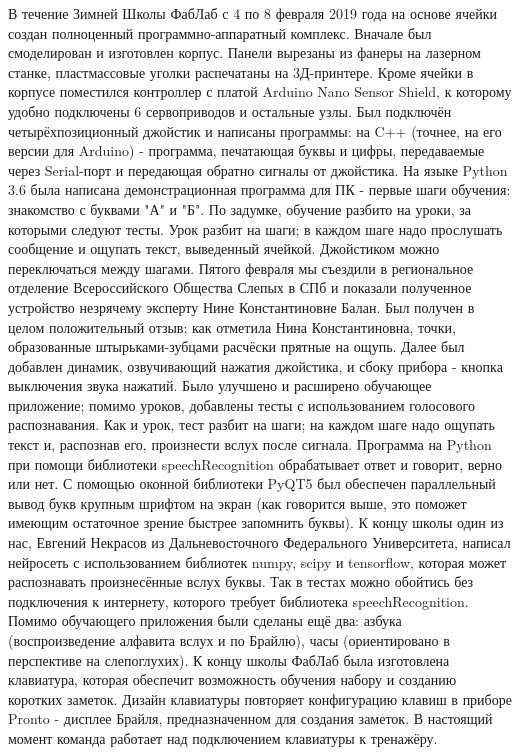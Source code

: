 \documentclass[a4paper,12pt]{article} %
\begin{document}
В течение Зимней Школы ФабЛаб с 4 по 8 февраля 2019 года на основе ячейки создан полноценный программно-аппаратный комплекс.
Вначале был смоделирован и изготовлен корпус. Панели вырезаны из фанеры на лазерном станке, пластмассовые уголки распечатаны на 3Д-принтере. Кроме ячейки в корпусе поместился контроллер с платой Arduino Nano Sensor Shield, к которому удобно подключены 6 сервоприводов и остальные узлы.
Был подключён четырёхпозиционный джойстик и написаны программы: на C++ (точнее, на его версии для Arduino) - программа, печатающая буквы и цифры, передаваемые через Serial-порт и передающая обратно сигналы от джойстика. На языке Python 3.6 была написана демонстрационная программа для ПК - первые шаги обучения: знакомство с буквами "А" и "Б". По задумке, обучение разбито на уроки, за которыми следуют тесты. Урок разбит на шаги; в каждом шаге надо прослушать сообщение и ощупать текст, выведенный ячейкой. Джойстиком можно переключаться между шагами.
Пятого февраля мы съездили в региональное отделение Всероссийского Общества Слепых в СПб и показали полученное устройство незрячему эксперту Нине Константиновне Балан. Был получен в целом положительный отзыв; как отметила Нина Константиновна, точки, образованные штырьками-зубцами расчёски прятные на ощупь.
Далее был добавлен динамик, озвучивающий нажатия джойстика, и сбоку прибора - кнопка выключения звука нажатий. Было улучшено и расширено обучающее приложение; помимо уроков, добавлены тесты с использованием голосового распознавания. Как и урок, тест разбит на шаги; на каждом шаге надо ощупать текст и, распознав его, произнести вслух после сигнала. Программа на Python при помощи библиотеки speechRecognition обрабатывает ответ и говорит, верно или нет.
С помощью оконной библиотеки PyQT5 был обеспечен параллельный вывод букв крупным шрифтом на экран (как говорится выше, это поможет имеющим остаточное зрение быстрее запомнить буквы).
К концу школы один из нас, Евгений Некрасов из Дальневосточного Федерального Университета, написал нейросеть с использованием библиотек numpy, scipy и tensorflow, которая может распознавать произнесённые вслух буквы. Так в тестах можно обойтись без подключения к интернету, которого требует библиотека speechRecognition.
Помимо обучающего приложения были сделаны ещё два: азбука (воспроизведение алфавита вслух и по Брайлю), часы (ориентировано в перспективе на слепоглухих).
К концу школы ФабЛаб была изготовлена клавиатура, которая обеспечит возможность обучения набору и созданию коротких заметок. Дизайн клавиатуры повторяет конфигурацию клавиш в приборе Pronto - дисплее Брайля, предназначенном для создания заметок. В настоящий момент команда работает над подключением клавиатуры к тренажёру.
\end{document}
